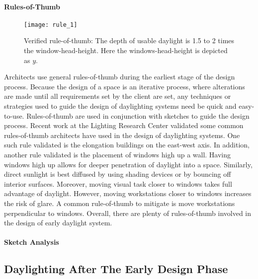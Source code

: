   \paragraph{Rules-of-Thumb}

  \begin{figure}[h]
  \texttt{[image: rule\_1]}
  \label{fig:rule_1}
  \caption{Verified rule-of-thumb: The depth of usable daylight is 1.5 to 2 times the window-head-height. Here the windows-head-height is depicted as $y$.}
  \end{figure}

  Architects use general rules-of-thumb during the earliest stage of the design process. 
  Because the design of a space is an iterative process, where alterations are made until all requirements set by the client are set\cite{Suwa}, any techniques or strategies used to guide the design of daylighting systems need be quick and easy-to-use. 
  Rules-of-thumb are used in conjunction with sketches to guide the design process.
  Recent work at the Lighting Research Center validated some common rules-of-thumb architects have used in the design of daylighting systems\cite{Leslie}.
  One such rule validated is the elongation buildings on the east-west axis.
  In addition, another rule validated is the placement of windows high up a wall.
  Having windows high up allows for deeper penetration of daylight into a space.
  Similarly, direct sunlight is best diffused by using shading devices or by bouncing off interior surfaces.
  Moreover, moving visual task closer to windows takes full advantage of daylight.
  However, moving workstations closer to windows increases the risk of glare. A common rule-of-thumb to mitigate is move workstations perpendicular to windows.
  Overall, there are plenty of rules-of-thumb involved in the design of early daylight system.\\


  \paragraph{Sketch Analysis}

  \subsection{Daylighting After The Early Design Phase}


